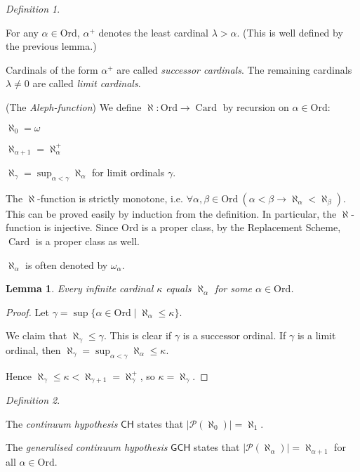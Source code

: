 \documentclass[a4paper, 11pt]{amsart}
\newtheorem{lemma}[lemma]{Lemma}
\theoremstyle{remark}
\newtheorem{definition}[definition]{Definition}
\newcommand{\axiomft}[1]{\mathsf{#1}}
\newcommand{\CH}{\axiomft{CH}}
\newcommand{\Ord}{\mathrm{Ord}}
\newcommand{\GCH}{\axiomft{GCH}}
\newcommand{\pow}{\mathcal{P}}
\DeclareMathOperator{\Card}{Card}
\newenvironment{enumerate-(a)}{\begin{enumerate}[label={\upshape (\alph*)}, leftmargin=2pc]}{\end{enumerate}}
\newenvironment{enumerate-(1)}{\begin{enumerate}[label={\upshape (\arabic*)}, leftmargin=2pc]}{\end{enumerate}}
\begin{document}
\begin{definition} \ 
\begin{enumerate-(1)} 
\item 
For any $\alpha\in \Ord$, $\alpha^+$ denotes the least cardinal $\lambda>\alpha$. 
(This is well defined by the previous lemma.)
\item 
Cardinals of the form $\alpha^+$ are called \emph{successor cardinals}. 
The remaining cardinals $\lambda\neq 0$ are called \emph{limit cardinals}. 
\item 
(The \emph{Aleph-function}) 
We define $\aleph\colon \Ord\rightarrow \Card$ by recursion on $\alpha\in \Ord$: 
\begin{enumerate-(a)} 
\item 
$\aleph_0=\omega$ 
\item 
$\aleph_{\alpha+1}=\aleph_\alpha^+$ 
\item 
$\aleph_\gamma=\sup_{\alpha<\gamma}\aleph_\alpha$ for limit ordinals $\gamma$. 
\end{enumerate-(a)} 
\end{enumerate-(1)} 
\end{definition} 

The $\aleph$-function is strictly monotone, i.e. $\forall \alpha, \beta\in \Ord\ (\alpha<\beta \rightarrow \aleph_\alpha < \aleph_\beta)$. 
This can be proved easily by induction from the definition. 
In particular, the $\aleph$-function is injective. 
Since $\Ord$ is a proper class, by the Replacement Scheme, $\Card$ is a proper class as well. 

$\aleph_\alpha$ is often denoted by $\omega_\alpha$. 


\begin{lemma} 
Every infinite cardinal $\kappa$ equals $\aleph_\alpha$ for some $\alpha\in \Ord$. 
\end{lemma} 
\begin{proof} 
Let $\gamma=\sup \{ \alpha \in \Ord \mid \aleph_\alpha \leq \kappa \}$. 

We claim that $\aleph_\gamma\leq \gamma$. 
This is clear if $\gamma$ is a successor ordinal. 
If $\gamma$ is a limit ordinal, then $\aleph_\gamma=\sup_{\alpha<\gamma}\aleph_\alpha\leq\kappa$. 

Hence $\aleph_\gamma\leq \kappa <\aleph_{\gamma+1}=\aleph_\gamma^+$, so $\kappa=\aleph_\gamma$.  
\end{proof} 

\begin{definition} \ 
\begin{enumerate-(1)} 
\item 
The \emph{continuum hypothesis} $\CH$ states that $|\pow(\aleph_0)|=\aleph_1$. 
\item 
The \emph{generalised continuum hypothesis} $\GCH$ states that $|\pow(\aleph_\alpha)|=\aleph_{\alpha+1}$ for all $\alpha\in \Ord$. 
\end{enumerate-(1)} 
\end{definition} 
\end{document}
